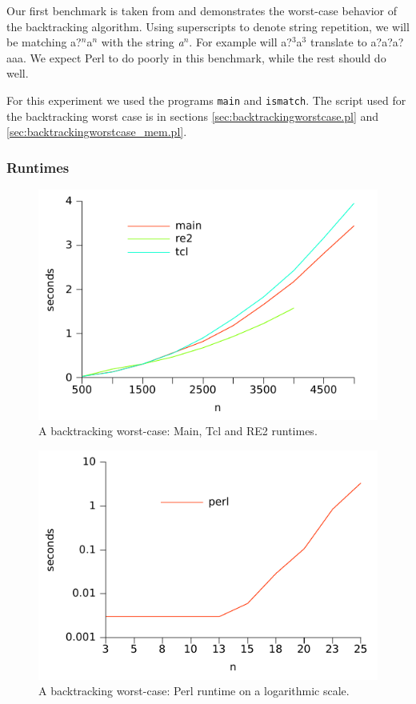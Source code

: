 Our first benchmark is taken from \cite{RussCox} and demonstrates the
worst-case behavior of the backtracking algorithm. Using superscripts
to denote string repetition, we will be matching \textsf{a?$^n$a$^n$}
with the string \textsl{a$^n$}. For example will \textsf{a?$^3$a$^3$}
translate to \textsf{a?a?a?aaa}. We expect Perl to do poorly in this
benchmark, while the rest should do well.

For this experiment we used the programs \texttt{main} and
\texttt{ismatch}. The script used for the backtracking worst case is
in sections \vref{sec:backtrackingworstcase.pl} and
\vref{sec:backtrackingworstcase_mem.pl}.

\subsubsection{Runtimes}

\begin{figure}
\centering
\includegraphics{benchmarks/backtrackingworstcase_maintclre2_normal.pdf}
\caption{A backtracking worst-case: Main, Tcl and RE2 runtimes.}
\label{fig:backtrackingworstcase_maintclre2_normal}
\end{figure}

\begin{figure}
\centering
\includegraphics{benchmarks/backtrackingworstcase_perl_log.pdf}
\caption{A backtracking worst-case: Perl runtime on a logarithmic scale.}
\label{fig:backtrackingworstcase_perl_log}
\end{figure}

